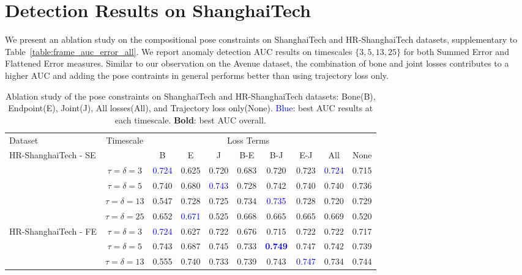 \documentclass[nohyperref]{article}
\theoremstyle{plain}
\theoremstyle{definition}
\theoremstyle{remark}
\begin{document}
\section{Detection Results on ShanghaiTech}
\label{appendix:st}

We present an ablation study on the compositional pose constraints on ShanghaiTech and HR-ShanghaiTech datasets,  supplementary to Table~\ref{table:frame_auc_error_all}. We report anomaly detection AUC results on timescales $\{3, 5, 13, 25\}$ for both Summed Error and Flattened Error measures. Similar to our observation on the Avenue dataset, the combination of bone and joint losses contributes to a higher AUC and adding the pose contraints in general performs better than using trajectory loss only.

\begin{table*}[h!]
\caption{Ablation study of the pose constraints on ShanghaiTech and HR-ShanghaiTech datasets: Bone(B), Endpoint(E), Joint(J), All losses(All), and Trajectory loss only(None). \textcolor{blue}{Blue}: best AUC results at each timescale. \textbf{Bold}: best AUC overall.}
\label{table:ablation_st} 
\centering
\begin{tabular}{p{2cm}|c|cccccccc} 
 \hline
  \multirow{1}{*}{Dataset}& \multirow{1}{*}{Timescale}& \multicolumn{7}{c}{Loss Terms} \\\cline{3-10}
  \multirow{4}{1.3cm}{ \hspace{15mm} HR-ShanghaiTech - SE} &    & B & E &J & B-E& B-J& E-J& All & None\\ \hline
  &$\tau=\delta=3$   & \textcolor{blue}{0.724}	&	0.625	&	0.720	&	0.683	&	0.720	&	0.723	&	\textcolor{blue}{0.724}  &0.715\\
  & $\tau=\delta=5$ & 0.740	&	0.680	&	\textcolor{blue}{0.743}	&	0.728	&	0.742	&	0.740	&	0.740	&0.736	\\
  & $\tau=\delta=13$ & 0.547	&	0.728	&	0.725	&	0.734	&\textcolor{blue}{0.735}	&	0.728	&	0.720 & 0.729\\
  & $\tau=\delta=25$ & 0.652	&	\textcolor{blue}{0.671}	&	0.525	&	0.668	&	0.665	&	0.665	&	0.669 & 0.520\\\hline
\multirow{4}{1.3cm}{ \hspace{15mm} HR-ShanghaiTech - FE} &$\tau=\delta=3$  & \textcolor{blue}{0.724}	&	0.627	&	0.722	&	0.676	&	0.715	&	0.722	&	0.722 &0.717 \\	
  & $\tau=\delta=5$ & 0.743	&	0.687	&	0.745	&	0.733	&	\textbf{\textcolor{blue}{0.749}}	&	0.747	&	0.742 & 0.739\\
  & $\tau=\delta=13$ & 0.555	&	0.740	&	0.733	&	0.739	&	0.743	&	\textcolor{blue}{0.747}	&	0.734 &0.744\\

\end{tabular}
\end{table*}
\end{document}
